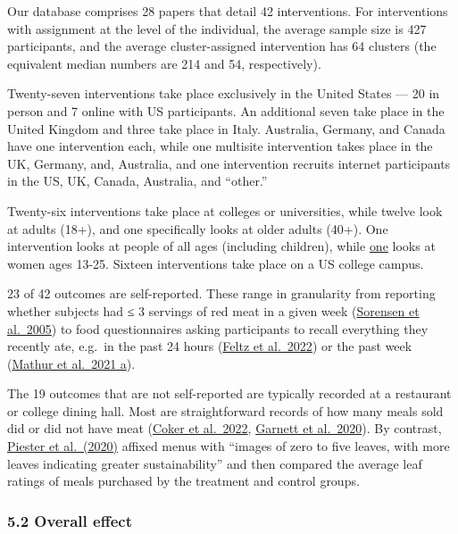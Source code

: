 \documentclass[
  letterpaper,
  DIV=11,
  numbers=noendperiod]{scrartcl}
\begin{document}
Our database comprises 28 papers that detail 42 interventions. For
interventions with assignment at the level of the individual, the
average sample size is 427 participants, and the average
cluster-assigned intervention has 64 clusters (the equivalent median
numbers are 214 and 54, respectively).

Twenty-seven interventions take place exclusively in the United States
--- 20 in person and 7 online with US participants. An additional seven
take place in the United Kingdom and three take place in Italy.
Australia, Germany, and Canada have one intervention each, while one
multisite intervention takes place in the UK, Germany, and, Australia,
and one intervention recruits internet participants in the US, UK,
Canada, Australia, and ``other.''

Twenty-six interventions take place at colleges or universities, while
twelve look at adults (18+), and one specifically looks at older adults
(40+). One intervention looks at people of all ages (including
children), while
\href{https://mercyforanimals.org/blog/impact-study/}{one} looks at
women ages 13-25. Sixteen interventions take place on a US college
campus.

23 of 42 outcomes are self-reported. These range in granularity from
reporting whether subjects had ≤ 3 servings of red meat in a given week
(\href{https://doi.org/10.2105/AJPH.2004.038745}{Sorensen et al.~2005})
to food questionnaires asking participants to recall everything they
recently ate, e.g.~in the past 24 hours
(\href{https://www.sciencedirect.com/science/article/abs/pii/S0195666322000721?via\%3Dihub}{Feltz
et al.~2022}) or the past week
(\href{https://pubmed.ncbi.nlm.nih.gov/34960107/}{Mathur et al.~2021
a}).

The 19 outcomes that are not self-reported are typically recorded at a
restaurant or college dining hall. Most are straightforward records of
how many meals sold did or did not have meat
(\href{https://doi.org/10.1016/j.appet.2021.105824}{Coker et al.~2022},
\href{https://doi.org/10.1038/s43016-020-0132-8}{Garnett et al.~2020}).
By contrast, \href{https://doi.org/10.1016/j.appet.2020.104842}{Piester
et al.~(2020)} affixed menus with ``images of zero to five leaves, with
more leaves indicating greater sustainability'' and then compared the
average leaf ratings of meals purchased by the treatment and control
groups.

\hypertarget{overall-effect}{%
\subsubsection{5.2 Overall effect}\label{overall-effect}}
\end{document}
